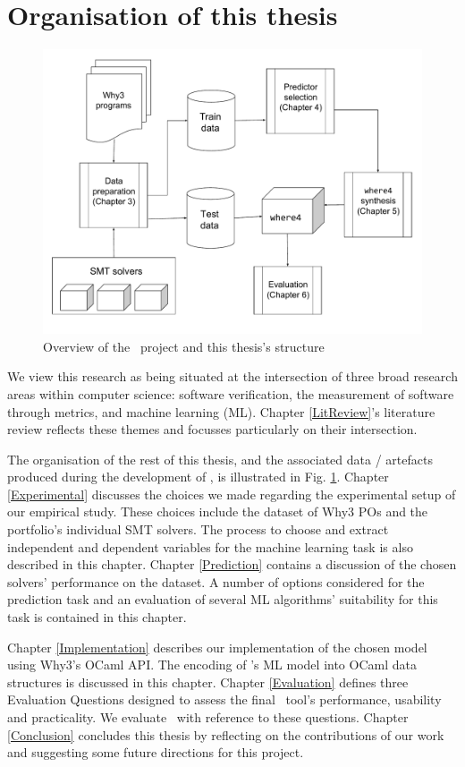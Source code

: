 \section{Organisation of this thesis}

\begin{figure}
	\centering
	\includegraphics[width=0.9\linewidth]{Figures/intoduction}
	\caption{Overview of the \where~project and this thesis's structure}
	\label{fig:introduction}
\end{figure}

We view this research as being situated at the intersection of three broad research areas within computer science: software verification, the measurement of software through metrics, and machine learning (ML). 
Chapter \ref{LitReview}'s literature review reflects these themes and focusses particularly on their intersection.  

The organisation of the rest of this thesis, and the associated data / artefacts produced during the development of \where, is illustrated in Fig. \ref{fig:introduction}. 
Chapter \ref{Experimental} discusses the choices we made regarding the experimental setup of our empirical study. 
These choices include the dataset of \textsf{Why3} POs and the portfolio's individual SMT solvers.
The process to choose and extract independent and dependent variables for the machine learning task is also described in this chapter.
Chapter \ref{Prediction} contains a discussion of the chosen solvers' performance on the dataset. 
A number of options considered for the prediction task and an evaluation of several ML algorithms' suitability for this task is contained in this chapter.

\sloppypar
Chapter \ref{Implementation} describes our implementation of the chosen model using \textsf{Why3}'s OCaml API.
The encoding of \where's ML model into OCaml data structures is discussed in this chapter.
Chapter \ref{Evaluation} defines three Evaluation Questions designed to assess the final \where~tool's performance, usability and practicality.
We evaluate \where~with reference to these questions.
Chapter \ref{Conclusion} concludes this thesis by reflecting on the contributions of our work and suggesting some future directions for this project.



